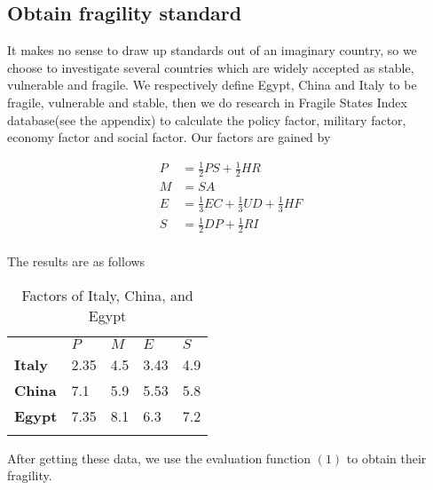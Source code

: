 \documentclass{mcmthesis}
\newlength\savedwidth
\newcommand\whline{\noalign{\global\savedwidth\arrayrulewidth
		\global\arrayrulewidth 1.2pt}%
	\hline
	\noalign{\global\arrayrulewidth\savedwidth}}
\newlength\savewidth
\newcommand\shline{\noalign{\global\savewidth\arrayrulewidth
		\global\arrayrulewidth 1.2pt}%
	\hline
	\noalign{\global\arrayrulewidth\savewidth}}
\begin{document}
	\subsection{Obtain fragility standard}
	It makes no sense to draw up standards out of an imaginary country, so we choose to investigate several countries which are widely accepted as stable, vulnerable and fragile.
	We respectively define Egypt, China and Italy to be fragile, vulnerable and stable, then we do research in Fragile States Index database(see the appendix) to calculate the policy factor, military factor, economy factor and social factor. Our factors are gained by 
	\begin{spacing}{1.5}
		\begin{equation}
		\begin{aligned}
		P&=\frac{1}{2}PS+\frac{1}{2}HR\\
		M&=SA\\
		E&=\frac{1}{3}EC+\frac{1}{3}UD+\frac{1}{3}HF\\
		S&=\frac{1}{2}DP+\frac{1}{2}RI\\
		\end{aligned}
		\end{equation}
	\end{spacing}
	
	The results are as follows
	
	\begin{table}[htbp]
		\renewcommand\arraystretch{1.5}
		\footnotesize
		\centering
		\begin{tabular}{m{2cm}<{\centering}|m{2cm}<{\centering}|m{2cm}<{\centering}|m{2cm}<{\centering}|m{2cm}<{\centering}}
			\whline
			&\textbf{$P$}&\textbf{$M$}&\textbf{$E$}&\textbf{$S$}\\
			\whline
			\textbf{Italy}& 2.35 & 4.5 & 3.43 & 4.9\\
			
			\textbf{China}& 7.1 & 5.9 & 5.53 & 5.8\\
			
			\textbf{Egypt}& 7.35 & 8.1 & 6.3 & 7.2\\
			
			\shline
		\end{tabular}
		\caption{Factors of Italy, China, and Egypt}\label{tab:Factors of Italy, China, and Egypt}
	\end{table}
	After getting these data, we use the evaluation function $(1)$ to obtain their fragility.
	
\end{document}
